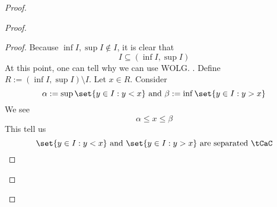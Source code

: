 \documentclass{report}
\begin{document}
\begin{proof}
\begin{proof}
\begin{proof}
Because $\inf I,\sup I\not \in I$, it is clear that 
\begin{equation*}
I\subseteq (\inf I,\sup I)
\end{equation*}
At this point, one can tell why we can use WOLG. . Define $R:=(\inf I,\sup I)\setminus I$. Let $x\in R$. Consider 
\begin{equation*}
\alpha :=\sup \set{y\in I:y<x}\text{ and }\beta :=\inf \set{y \in I:y>x}
\end{equation*}
We see 
\begin{equation*}
\alpha \leq x\leq \beta 
\end{equation*}
This tell us 
\begin{equation*}
\set{y\in I:y<x}\text{ and }\set{y\in I:y>x}\text{ are separated }\tCaC
\end{equation*}


\end{proof}

\end{proof}
\end{proof}
\end{document}
